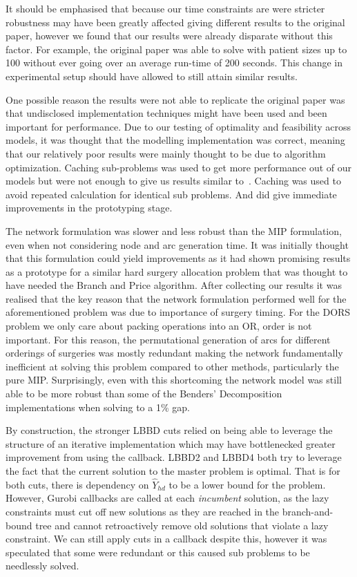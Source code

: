 It should be emphasised that because our time constraints are were stricter robustness may have been greatly affected giving different results to the original paper, however we found that our results were already disparate without this factor. For example, the original paper was able to solve with patient sizes up to 100 without ever going over an average run-time of 200 seconds. This change in experimental setup should have allowed to still attain similar results.

One possible reason the results were not able to replicate the original paper was that undisclosed implementation techniques might have been used and been important for performance. Due to our testing of optimality and feasibility across models, it was thought that the modelling implementation was correct, meaning that our relatively poor results were mainly thought to be due to algorithm optimization. Caching sub-problems was used to get more performance out of our models but were not enough to give us results similar to~\cite{roshanaei2017propagating}. Caching was used to avoid repeated calculation for identical sub problems. And did give immediate improvements in the prototyping stage.

The network formulation was slower and less robust than the MIP formulation, even when not considering node and arc generation time. It was initially thought that this formulation could yield improvements as it had shown promising results as a prototype for a similar hard surgery allocation problem that was thought to have needed the Branch and Price algorithm\cite{DoulabiBranchPriceOR}. After collecting our results it was realised that the key reason that the network formulation performed well for the aforementioned problem was due to importance of surgery timing. For the DORS problem we only care about packing operations into an OR, order is not important. For this reason, the permutational generation of arcs for different orderings of surgeries was mostly redundant making the network fundamentally inefficient at solving this problem compared to other methods, particularly the pure MIP. Surprisingly, even with this shortcoming the network model was still able to be more robust than some of the Benders' Decomposition implementations when solving to a 1\% gap.

By construction, the stronger LBBD cuts relied on being able to leverage the structure of an iterative implementation which may have bottlenecked greater improvement from using the callback. LBBD2 and LBBD4 both try to leverage the fact that the current solution to the master problem is optimal. That is for both cuts, there is dependency on $\hat{Y}_{hd}$ to be a lower bound for the problem. However, Gurobi callbacks are called at each \textit{incumbent} solution, as the lazy constraints must cut off new solutions as they are reached in the branch-and-bound tree and cannot retroactively remove old solutions that violate a lazy constraint. We can still apply cuts in a callback despite this, however it was speculated that some were redundant or this caused sub problems to be needlessly solved. 

